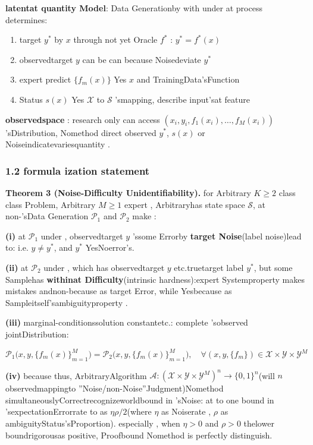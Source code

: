 \documentclass[
  12pt,
]{article}
\providecommand{\tightlist}{%
  \setlength{\itemsep}{0pt}\setlength{\parskip}{0pt}}
\begin{document}
\textbf{latentat quantity Model}: Data Generationby with under at process determines: 

\begin{enumerate}
\def\labelenumi{\arabic{enumi}.}
\tightlist
\item
  target  \(y^*\) by  \(x\) through not yet  Oracle \(f^*\)
  : \(y^* = f^*(x)\)
\item
  observedtarget  \(y\) can be can because Noisedeviate \(y^*\)
\item
  expert predict \(\{f_m(x)\}\) Yes \(x\) and TrainingData'sFunction
\item
  Status \(s(x)\) Yes \(\mathcal{X}\) to  \(\mathcal{S}\)
  'smapping, describe input'sat feature
\end{enumerate}

\textbf{observedspace }: research only can access
\((x_i, y_i, f_1(x_i), \dots, f_M(x_i))\) 'sDistribution, Nomethod direct observed
\(y^*\), \(s(x)\) or Noiseindicatevariesquantity . 

\subsubsection{1.2 formula ization statement}\label{ux5f62ux5f0fux5316ux9648ux8ff0}

\textbf{Theorem 3 (Noise-Difficulty Unidentifiability).} for Arbitrary
\(K \geq 2\) class class Problem, Arbitrary \(M \geq 1\) expert , Arbitraryhas state space
\(\mathcal{S}\), at non-'sData Generation \(\mathcal{P}_1\) and 
\(\mathcal{P}_2\) make : 

\textbf{(i)} at  \(\mathcal{P}_1\) under , observedtarget  \(y\)
'ssome Errorby \textbf{target Noise}(label noise)lead to: i.e. \(y \neq y^*\), and 
\(y^*\) YesNoerror's. 

\textbf{(ii)} at  \(\mathcal{P}_2\) under , which has observedtarget  \(y\) etc.truetarget label
\(y^*\), but some Samplehas \textbf{withinat Difficulty}(intrinsic
hardness):expert Systemproperty makes mistakes andnon-because as target Error, while Yesbecause as Sampleitself'sambiguityproperty . 

\textbf{(iii)} marginal-conditionssolution constantetc.: complete 'sobserved jointDistribution: 

\[\mathcal{P}_1\bigl(x, y, \{f_m(x)\}_{m=1}^M\bigr) = \mathcal{P}_2\bigl(x, y, \{f_m(x)\}_{m=1}^M\bigr), \quad \forall (x, y, \{f_m\}) \in \mathcal{X} \times \mathcal{Y} \times \mathcal{Y}^M\]

\textbf{(iv)} because thus, ArbitraryAlgorithm
\(\mathcal{A}: (\mathcal{X} \times \mathcal{Y} \times \mathcal{Y}^M)^n \to \{0,1\}^n\)(will 
\(n\)
observedmappingto ''Noise/non-Noise''Judgment)Nomethod simultaneouslyCorrectrecognizeworldbound in 'sNoise: at to one bound in 'sexpectationErrorrate to as 
\(\eta\rho/2\)(where \(\eta\) as Noiserate , \(\rho\)
as ambiguityStatus'sProportion). especially , when  \(\eta > 0\) and  \(\rho > 0\)
thelower boundrigorousas positive, Proofbound Nomethod is perfectly distinguish. 
\end{document}
